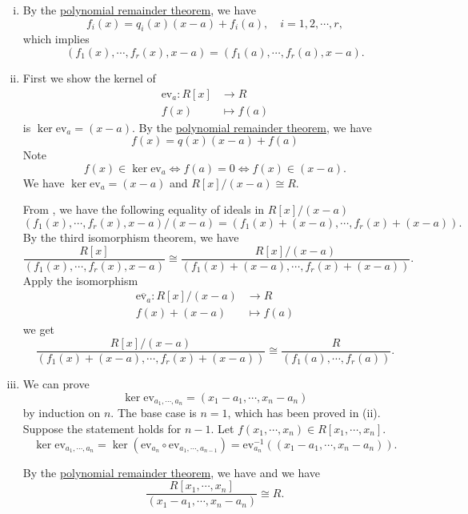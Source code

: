 \begin{prf}
    \begin{enumerate}[(i)]
        \item 
        By the \hyperref[th:polynomial_remainder_theorem]{polynomial remainder theorem}, we have
        \[
        f_i(x)=q_i(x)(x-a)+f_i(a),\quad i=1,2,\cdots,r,
        \]
        which implies
        \[
        (f_1(x),\cdots,f_r(x),x-a)=(f_1(a),\cdots,f_r(a),x-a).
        \]
        \item First we show the kernel of 
        \begin{align*}
            \mathrm{ev}_a:R[x]&\longrightarrow R\\
            f(x)&\longmapsto f(a)
        \end{align*}
        is $\ker \mathrm{ev}_a=(x-a)$.
        By the \hyperref[th:polynomial_remainder_theorem]{polynomial remainder theorem}, we have
        \[
        f(x)=q(x)(x-a)+f(a)
        \]
        Note
        \[
        f(x)\in \ker \mathrm{ev}_{a} \iff f(a)=0\iff f(x)\in (x-a).
        \]
        We have $\ker \mathrm{ev}_a=(x-a)$ and $R[x]/(x-a)\cong R$. 

        From , we have the following equality of ideals in $R[x]/(x-a)$
        \[
            (f_1(x),\cdots,f_r(x),x-a)/(x-a)=\left(f_1(x)+(x-a),\cdots,f_r(x)+(x-a)\right).
        \]
        By the third isomorphism theorem, we have
        \[
        \frac{R[x]}{(f_1(x),\cdots,f_r(x),x-a)}\cong \frac{R[x]/(x-a)}{\left(f_1(x)+(x-a),\cdots,f_r(x)+(x-a)\right)}.
        \]
        Apply the isomorphism 
        \begin{align*}
            \overline{\mathrm{ev}_a}:R[x]/(x-a)&\longrightarrow R\\
            f(x)+(x-a)&\longmapsto f(a)
        \end{align*}
        we get
        \[
            \frac{R[x]/(x-a)}{\left(f_1(x)+(x-a),\cdots,f_r(x)+(x-a)\right)} \cong \frac{R}{\left(f_1(a),\cdots,f_r(a) \right)}.
        \]
        \item We can prove 
        \[
        \ker \mathrm{ev}_{a_1,\cdots,a_n}=(x_1-a_1,\cdots,x_n-a_n)
        \]
        by induction on $n$. The base case is $n=1$, which has been proved in (ii). Suppose the statement holds for $n-1$. Let $f(x_1,\cdots,x_n)\in R[x_1,\cdots,x_n]$.
        \[
        \ker \mathrm{ev}_{a_1,\cdots,a_n}=\ker \left(\mathrm{ev}_{a_n}\circ \mathrm{ev}_{a_1,\cdots,a_{n-1}}\right)= \mathrm{ev}_{a_n}^{-1}(\left(x_1-a_1,\cdots,x_n-a_n\right)).
        \]
        
        By the \hyperref[th:polynomial_remainder_theorem]{polynomial remainder theorem}, we have
        and we have
    \[
    \frac{R[x_1,\cdots,x_n]}{(x_1-a_1,\cdots,x_n-a_n)}\cong R.
    \]
    \end{enumerate}
\end{prf}

